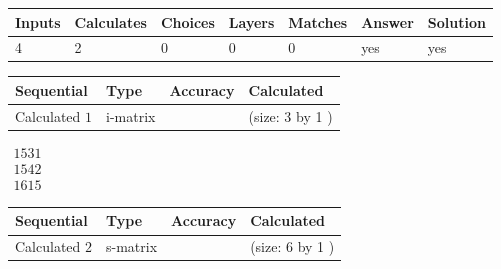 \documentclass[12pt]{article}
\begin{document}
 
 
\noindent{}
 
 

 
 
 
\noindent{}
 
 

 
 
\noindent{}
 
 

 
\vspace{0.3in}
   
   
   
   
\noindent\begin{tabular}{|l|l|l|l|l|l|l|}
 \hline
Inputs & Calculates & Choices & Layers & Matches & Answer & Solution \\ \hline
           4  & 
           2  & 
           0
  & 
           0  & 
           0  & 
  yes & 
  yes 
  \\ \hline
 \end{tabular}
   
   
   
   
\noindent{}
   
   
  
  
\noindent\begin{tabular}{|l|l|l|l|}
\hline
 Sequential & Type & Accuracy & Calculated \\ 
\hline
 
 
  Calculated $            1 $ & i-matrix &  & 
 (size:            3  by            1 )
 \\  \hline  
 \end{tabular}
   
   
$\begin{array}{
 c
 }
        1531  \\ 
        1542  \\ 
        1615
 \end{array}  $ 
  
  
\noindent\begin{tabular}{|l|l|l|l|}
\hline
 Sequential & Type & Accuracy & Calculated \\ 
\hline
 
 
  Calculated $            2 $ & s-matrix & & 
 (size:            6  by            1 )
 \\  \hline  
 \end{tabular}
   
\end{document}
